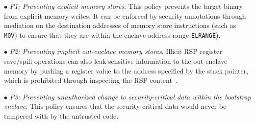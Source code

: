 \vspace{2pt}\noindent$\bullet$\textit{ P1: Preventing explicit \DIFdelbegin {}\DIFdelend \DIFaddbegin {}\DIFaddend memory stores}. This policy prevents the target binary from explicit memory writes. It can be enforced by security annotations through mediation on the destination addresses of memory store instructions (such as \texttt{MOV}) to ensure that they are within the enclave address range \texttt{ELRANGE}).

\vspace{2pt}\noindent$\bullet$\textit{ P2: Preventing implicit out-enclave memory stores}. Illicit RSP register save/spill operations can also leak sensitive information to the out-enclave memory by pushing a register value to the address specified by the stack pointer, which is prohibited through inspecting the RSP content~\cite{wang2018detect}.  

\vspace{2pt}\noindent$\bullet$\textit{ P3: Preventing unauthorized change to security-critical data within the bootstrap enclave}. This policy ensures that the security-critical data would never be tampered with by the untrusted code.


